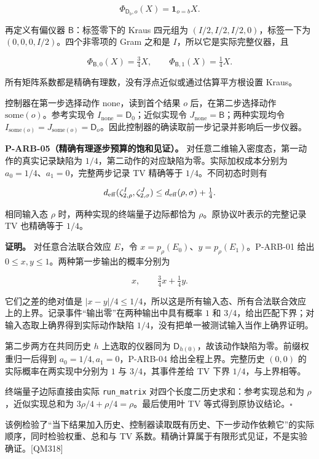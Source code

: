 \documentclass[
  11pt,
  oneside]{book}
\begin{document}
\[
\Phi_{\mathsf D_b,o}(X)=\mathbf1_{o=b}X.
\]

再定义有偏仪器 \(\mathsf B\)：标签零下的 Kraus 四元组为
\((I/2,I/2,I/2,0)\)，标签一下为 \((0,0,0,I/2)\)。四个非零项的 Gram
之和是 \(I\)，所以它是实际完整仪器，且

\[
\Phi_{\mathsf B,0}(X)=\tfrac34X,
\qquad \Phi_{\mathsf B,1}(X)=\tfrac14X.
\]

所有矩阵系数都是精确有理数，没有浮点近似或通过估算平方根设置 Kraus。

控制器在第一步选择动作 \(\mathrm{none}\)，读到首个结果 \(o\)
后，在第二步选择动作 \(\mathrm{some}(o)\)。参考实现令
\(I_{\mathrm{none}}=\mathsf D_0\)；近似实现令
\(J_{\mathrm{none}}=\mathsf B\)；两种实现均令
\(I_{\mathrm{some}(o)}=J_{\mathrm{some}(o)}=\mathsf D_o\)。因此控制器的确读取前一步记录并影响后一步仪器。

\protect\hypertarget{p-arb-05}{}{}

\textbf{P-ARB-05（精确有理逐步预算的饱和见证）。}
对任意二维输入密度态，第一动作的真实记录缺陷为
\(1/4\)，第二动作的对应缺陷为零。实际加权成本分别为
\(a_0=1/4\)、\(a_1=0\)，完整两步记录 TV 精确等于 \(1/4\)。不同初态时则有

\[
d_{\rm eff}(\zeta^I_{2,\rho},\zeta^J_{2,\sigma})
\le d_{\rm eff}(\rho,\sigma)+\tfrac14.
\]

相同输入态 \(\rho\) 时，两种实现的终端量子边际都恰为
\(\rho\)。原协议叶表示的完整记录 TV 也精确等于 \(1/4\)。

\textbf{证明。} 对任意合法联合效应 \(E\)，令
\(x=p_\rho(E_0)\)、\(y=p_\rho(E_1)\)。P-ARB-01 给出
\(0\le x,y\le1\)。两种第一步输出的概率分别为

\[
x,\qquad \tfrac34x+\tfrac14y.
\]

它们之差的绝对值是
\(|x-y|/4\le1/4\)，所以这是所有输入态、所有合法联合效应上的上界。记录事件``输出零''在两种输出中具有概率
\(1\) 和 \(3/4\)，给出匹配下界；对输入态取上确界得到实际动作缺陷
\(1/4\)，没有把单一被测试输入当作上确界证明。

第二步两方在共同历史 \(h\) 上选取的仪器同为
\(\mathsf D_{h(0)}\)，故该动作缺陷为零。前缀权重归一后得到
\(a_0=1/4,a_1=0\)，P-ARB-04 给出全程上界。完整历史 \((0,0)\)
的实际概率在两实现中分别为 \(1\) 与 \(3/4\)，其事件差给 TV 下界
\(1/4\)，与上界相等。

终端量子边际直接由实际 \texttt{run\_\allowbreak matrix}
对四个长度二历史求和：参考实现总和为 \(\rho\)，近似实现总和为
\(3\rho/4+\rho/4=\rho\)。最后使用叶 TV 等式得到原协议结论。\(\square\)

该例检验了``当下结果加入历史、控制器读取既有历史、下一步动作依赖它''的实际顺序，同时检验权重、总和与
TV 系数。精确计算属于有限形式见证，不是实验确证。{[}QM318{]}
\end{document}
